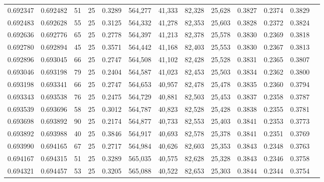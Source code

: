 \begin{tabular}{rrrrrrrrrrrrr}
0.692347 & 0.692482 &    51 &  25 &                                     0.3289 & 564,277 &  41,333 &  82,328 &  25,628 & 0.3827 & 0.2374 & 0.3829 \\
0.692483 & 0.692628 &    55 &  25 &                                     0.3125 & 564,332 &  41,278 &  82,353 &  25,603 & 0.3828 & 0.2372 & 0.3824 \\
0.692636 & 0.692776 &    65 &  25 &                                     0.2778 & 564,397 &  41,213 &  82,378 &  25,578 & 0.3830 & 0.2369 & 0.3818 \\
0.692780 & 0.692894 &    45 &  25 &                                     0.3571 & 564,442 &  41,168 &  82,403 &  25,553 & 0.3830 & 0.2367 & 0.3813 \\
0.692896 & 0.693045 &    66 &  25 &                                     0.2747 & 564,508 &  41,102 &  82,428 &  25,528 & 0.3831 & 0.2365 & 0.3807 \\
0.693046 & 0.693198 &    79 &  25 &                                     0.2404 & 564,587 &  41,023 &  82,453 &  25,503 & 0.3834 & 0.2362 & 0.3800 \\
0.693198 & 0.693341 &    66 &  25 &                                     0.2747 & 564,653 &  40,957 &  82,478 &  25,478 & 0.3835 & 0.2360 & 0.3794 \\
0.693343 & 0.693538 &    76 &  25 &                                     0.2475 & 564,729 &  40,881 &  82,503 &  25,453 & 0.3837 & 0.2358 & 0.3787 \\
0.693539 & 0.693696 &    58 &  25 &                                     0.3012 & 564,787 &  40,823 &  82,528 &  25,428 & 0.3838 & 0.2355 & 0.3781 \\
0.693698 & 0.693892 &    90 &  25 &                                     0.2174 & 564,877 &  40,733 &  82,553 &  25,403 & 0.3841 & 0.2353 & 0.3773 \\
0.693892 & 0.693988 &    40 &  25 &                                     0.3846 & 564,917 &  40,693 &  82,578 &  25,378 & 0.3841 & 0.2351 & 0.3769 \\
0.693990 & 0.694165 &    67 &  25 &                                     0.2717 & 564,984 &  40,626 &  82,603 &  25,353 & 0.3843 & 0.2348 & 0.3763 \\
0.694167 & 0.694315 &    51 &  25 &                                     0.3289 & 565,035 &  40,575 &  82,628 &  25,328 & 0.3843 & 0.2346 & 0.3758 \\
0.694321 & 0.694457 &    53 &  25 &                                     0.3205 & 565,088 &  40,522 &  82,653 &  25,303 & 0.3844 & 0.2344 & 0.3754 \\

\end{tabular}
